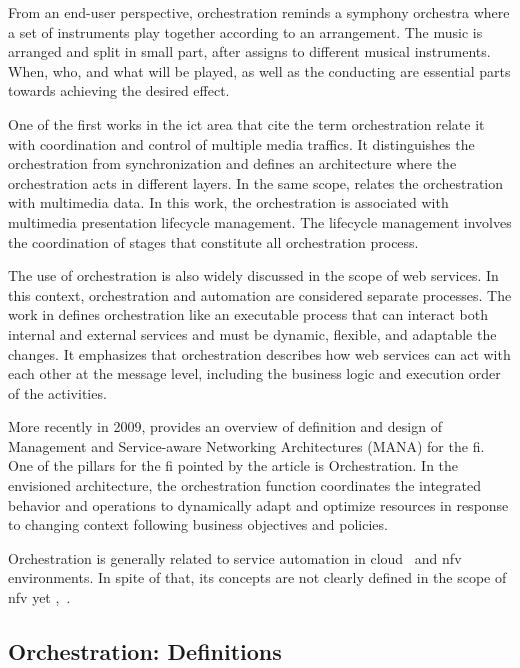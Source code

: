 From an end-user perspective, orchestration reminds a symphony orchestra where a set of instruments play together according to an arrangement. The music is arranged and split in small part, after assigns to different musical instruments. When, who, and what will be played, as well as the conducting are essential parts towards achieving the desired effect.  

One of the first works in the \gls{ict} area that cite the term orchestration \cite{Campbell1992} relate it with coordination and control of multiple media traffics. It distinguishes the orchestration from synchronization and defines an architecture where the orchestration acts in different layers.
In the same scope, \cite{Robbins1997ImplementationArchitecture} relates the orchestration with multimedia data. In this work, the orchestration is associated with multimedia presentation lifecycle management. The lifecycle management involves the coordination of stages that constitute all orchestration process. 

The use of orchestration is also widely discussed in the scope of web services. In this context, orchestration and automation are considered separate processes. The work in \cite{Peltz2003WebChoreography} defines orchestration like an executable process that can interact both internal and external services and must be dynamic, flexible, and adaptable the changes. It emphasizes that orchestration describes how web services can act with each other at the message level, including the business logic and execution order of the activities. 

More recently in 2009, \cite{Galis2009ManagementInternet} provides an overview of definition and design of Management and Service-aware Networking Architectures (MANA) for the \gls{fi}. One of the pillars for the \gls{fi} pointed by the article is Orchestration. In the envisioned architecture, the orchestration function coordinates the integrated behavior and operations to dynamically adapt and optimize resources in response to changing context following business objectives and policies.

Orchestration is generally related to service automation in cloud~\cite{Abosi2011} and \gls{nfv} environments. In spite of that, its concepts are not clearly defined in the scope of \gls{nfv} yet \cite{Kuklinski2016DesignOrchestrators},~\cite{Alvizu2016AdvanceEra}. 

\subsection{Orchestration: Definitions}

